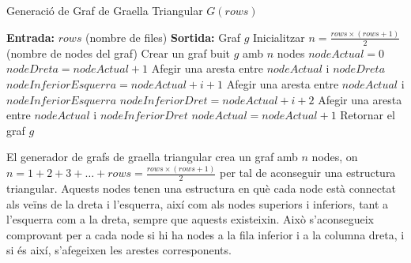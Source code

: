 \documentclass[a4paper]{article}
\begin{document}
	\begin{algorithm} [H]
		\caption{Generació de Graf de Graella Triangular $G(rows)$}
		\begin{algorithmic} [1]
			\Statex \textbf{Entrada:} $rows$ (nombre de files)
			\Statex \textbf{Sortida:} Graf $g$
			\Statex \vspace{-0.25em}
			\State Inicialitzar $n = \frac{rows \times (rows + 1)}{2}$ (nombre de nodes del graf)
			\State Crear un graf buit $g$ amb $n$ nodes
			\State $nodeActual = 0$
						\State $nodeDreta = nodeActual + 1$
						\State Afegir una aresta entre $nodeActual$ i $nodeDreta$
					\EndIf
						\State $nodeInferiorEsquerra = nodeActual + i + 1$
						\State Afegir una aresta entre $nodeActual$ i $nodeInferiorEsquerra$
						\State $nodeInferiorDret = nodeActual + i + 2$
						\State Afegir una aresta entre $nodeActual$ i $nodeInferiorDret$
					\EndIf
					\State $nodeActual = nodeActual + 1$
				\EndFor
			\EndFor
			\State Retornar el graf $g$
		\end{algorithmic}
	\end{algorithm}
	
	El generador de grafs de graella triangular crea un graf amb $n$ nodes, on $n = 1 + 2 + 3 + \ldots + rows = \frac{rows \times (rows + 1)}{2}$ per tal de aconseguir una estructura triangular. Aquests nodes tenen una estructura en què cada node està connectat als veïns de la dreta i l'esquerra, així com als nodes superiors i inferiors, tant a l'esquerra com a la dreta, sempre que aquests existeixin. Això s'aconsegueix comprovant per a cada node si hi ha nodes a la fila inferior i a la columna dreta, i si és així, s'afegeixen les arestes corresponents. \\
\end{document}
